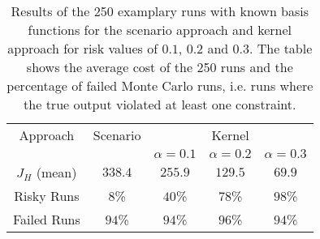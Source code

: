 \begin{table}
\centering
\begin{tabular}{|c| c| c| c| c|}
\hline
Approach & Scenario &  \multicolumn{3}{|c|}{Kernel}\\  \cline{3-5} & &  $\alpha = 0.1$ & $\alpha = 0.2$ & $\alpha = 0.3$ \\
\hline
$J_H$ (mean) & $338.4$ & $255.9$ & $129.5$ & $69.9$\\
\hline
Risky Runs & $8$\% & $40$\% & $78$\% & $98$\% \\
\hline
Failed Runs & $94$\% & $94$\% & $96$\% & $94$\% \\
\hline
\end{tabular}
\caption{Results of the 250 examplary runs with known basis functions for the scenario approach and kernel approach for risk values of $0.1$, $0.2$ and $0.3$. The table shows the average cost of the 250 runs and the percentage of failed Monte Carlo runs, i.e. runs where the true output violated at least one constraint.}
\label{tab:results_corridor}
\end{table} 


